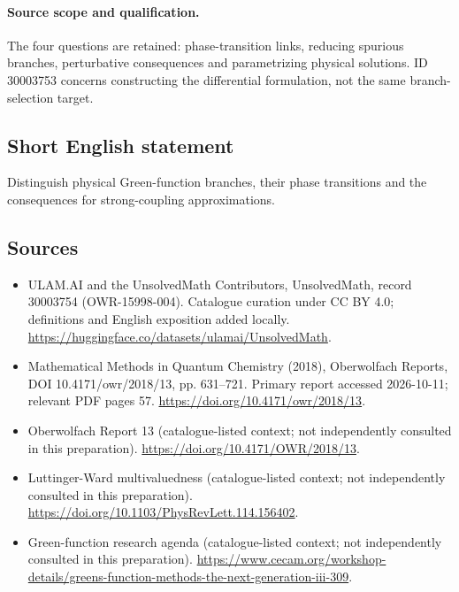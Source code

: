 \documentclass[11pt]{article}
\begin{document}
\paragraph{Source scope and qualification.}
The four questions are retained: phase-transition links, reducing spurious branches, perturbative consequences and parametrizing physical solutions. ID 30003753 concerns constructing the differential formulation, not the same branch-selection target.
\subsection{Short English statement}
Distinguish physical Green-function branches, their phase transitions and the consequences for strong-coupling approximations.
\subsection{Sources}
\begin{itemize}
\item[\hypertarget{source:30003754:1}{S1}] ULAM.AI and the UnsolvedMath Contributors, UnsolvedMath, record 30003754 (OWR-15998-004). Catalogue curation under CC BY 4.0; definitions and English exposition added locally.
\url{https://huggingface.co/datasets/ulamai/UnsolvedMath}.
\item[\hypertarget{source:30003754:2}{S2}] Mathematical Methods in Quantum Chemistry (2018), Oberwolfach Reports, DOI 10.4171/owr/2018/13, pp. 631--721. Primary report accessed 2026-10-11; relevant PDF pages 57.
\url{https://doi.org/10.4171/owr/2018/13}.
\item[\hypertarget{source:30003754:3}{S3}] Oberwolfach Report 13 (catalogue-listed context; not independently consulted in this preparation).
\url{https://doi.org/10.4171/OWR/2018/13}.
\item[\hypertarget{source:30003754:4}{S4}] Luttinger-Ward multivaluedness (catalogue-listed context; not independently consulted in this preparation).
\url{https://doi.org/10.1103/PhysRevLett.114.156402}.
\item[\hypertarget{source:30003754:5}{S5}] Green-function research agenda (catalogue-listed context; not independently consulted in this preparation).
\url{https://www.cecam.org/workshop-details/greens-function-methods-the-next-generation-iii-309}.
\end{itemize}
\label{end:30003754}
\end{document}

